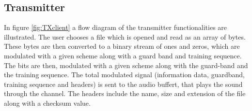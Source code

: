 \documentclass[12pt,a4paper,openright]{report}
\begin{document}
\clearpage
\subsection{Transmitter}

In figure \ref{fig:TXclient} a flow diagram of the transmitter functionalities are illustrated. The user chooses a file which is opened and read as an array of bytes. These bytes are then converted to a binary stream of ones and zeros, which are modulated with a given scheme along with a guard band and training sequence. The bits are then, modulated with a given scheme along with the guard-band and the training sequence. The total modulated signal (information data, guardband, training sequence and headers) is sent to the audio buffert, that plays the sound through the channel. The headers include the name, size and extension of the file along with a checksum value.
\end{document}
